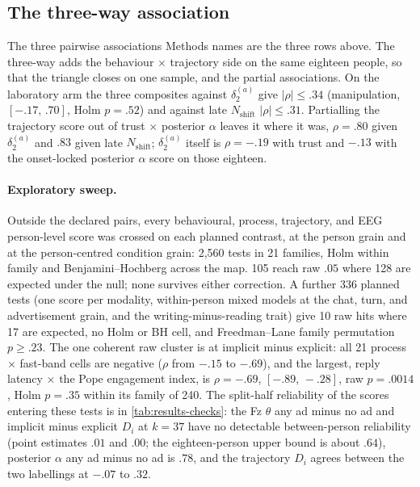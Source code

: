 \subsection{The three-way association}
\label{sec:results-combos-three-way}

The three pairwise associations Methods names are the three rows above. The three-way adds the behaviour \(\times\) trajectory side on the same eighteen people, so that the triangle closes on one sample, and the partial associations. On the laboratory arm the three composites against \(\delta^{(a)}_2\) give \(|\rho|\le.34\) (manipulation, \([-.17,\,.70]\), Holm \(p=.52\)) and against late \(N_{\mathrm{shift}}\) \(|\rho|\le.31\). Partialling the trajectory score out of trust \(\times\) posterior \(\alpha\) leaves it where it was, \(\rho=.80\) given \(\delta^{(a)}_2\) and \(.83\) given late \(N_{\mathrm{shift}}\); \(\delta^{(a)}_2\) itself is \(\rho=-.19\) with trust and \(-.13\) with the onset-locked posterior \(\alpha\) score on those eighteen.

\paragraph{Exploratory sweep.}
Outside the declared pairs, every behavioural, process, trajectory, and EEG person-level score was crossed on each planned contrast, at the person grain and at the person-centred condition grain: 2,560 tests in 21 families, Holm within family and Benjamini--Hochberg across the map. 105 reach raw \(.05\) where 128 are expected under the null; none survives either correction. A further 336 planned tests (one score per modality, within-person mixed models at the chat, turn, and advertisement grain, and the writing-minus-reading trait) give 10 raw hits where 17 are expected, no Holm or BH cell, and Freedman--Lane family permutation \(p\ge.23\). The one coherent raw cluster is at implicit minus explicit: all 21 process \(\times\) fast-band cells are negative (\(\rho\) from \(-.15\) to \(-.69\)), and the largest, reply latency \(\times\) the Pope engagement index, is \(\rho=-.69\), \([-.89,\,-.28]\), raw \(p=.0014\), Holm \(p=.35\) within its family of 240. The split-half reliability of the scores entering these tests is in \autoref{tab:results-checks}: the Fz \(\theta\) any ad minus no ad and implicit minus explicit \(D_i\) at \(k=37\) have no detectable between-person reliability (point estimates \(.01\) and \(.00\); the eighteen-person upper bound is about \(.64\)), posterior \(\alpha\) any ad minus no ad is \(.78\), and the trajectory \(D_i\) agrees between the two labellings at \(-.07\) to \(.32\).

